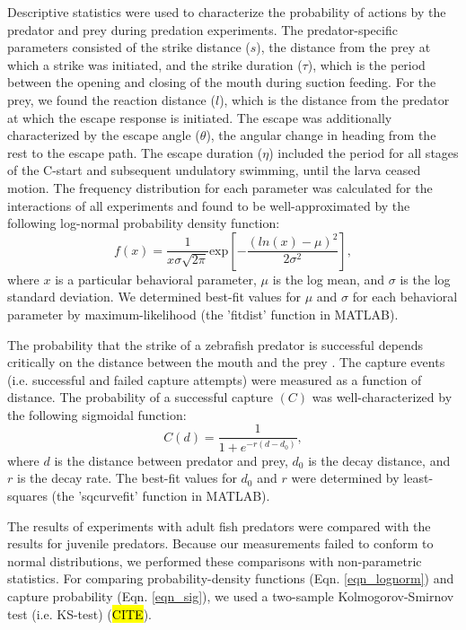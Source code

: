 \documentclass[]{rsos}%
\begin{document}
Descriptive statistics were used to characterize the probability of actions by the predator and prey during predation experiments.
The predator-specific parameters consisted of the strike distance ($s$), the distance from the prey at which a strike was initiated, and the strike duration ($\tau$), which is the period between the opening and closing of the mouth during suction feeding. 
For the prey, we found the reaction distance ($l$), which is the distance from the predator at which the escape response is initiated.
The escape was additionally characterized by the escape angle ($\theta$), the angular change in heading from the rest to the escape path.
The escape duration ($\eta$) included the period for all stages of the C-start and subsequent undulatory swimming, until the larva ceased motion.
The frequency distribution for each parameter was calculated for the interactions of all experiments and found to be well-approximated by the following log-normal probability density function:
%
\begin{equation}%
f(x) = \frac{1}{x\sigma \sqrt{2 \pi}} \text{exp} \left[ -{\frac{(ln(x)-\mu)^2}{2\sigma ^2}} \right],
\label{eqn_lognorm}
\end{equation}
%
where $x$ is a particular behavioral parameter, $\mu$ is the log mean, and $\sigma$ is the log standard deviation. 
We determined best-fit values for $\mu$ and $\sigma$ for each behavioral parameter by maximum-likelihood (the 'fitdist' function in MATLAB).

The probability that the strike of a zebrafish predator is successful depends critically on the distance between the mouth and the prey \cite{Stewart:2013bha}.
The capture events (i.e. successful and failed capture attempts) were measured as a function of distance. The probability of a successful capture $(C)$ was well-characterized by the following sigmoidal function:
%
\begin{equation}%
C(d) = \frac{1}{1+e^{-r(d-d_0)}},
\label{eqn_sig} 
\end{equation}
%
where $d$ is the distance between predator and prey, $d_0$ is the decay distance, and $r$ is the decay rate. 
The best-fit values for $d_0$ and $r$ were determined by least-squares (the 'sqcurvefit' function in MATLAB).

The results of experiments with adult fish predators were compared with the results for juvenile predators.
Because our measurements failed to conform to normal distributions, we performed these comparisons with non-parametric statistics. 
For comparing probability-density functions (Eqn. \ref{eqn_lognorm}) and capture probability (Eqn. \ref{eqn_sig}), we used a two-sample Kolmogorov-Smirnov test (i.e. KS-test) (\hl{CITE}). 
\end{document}
